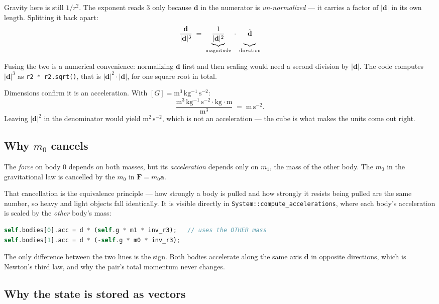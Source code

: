 \documentclass[11pt,a4paper]{article}
\newcommand{\vd}{\mathbf{d}}
\newcommand{\va}{\mathbf{a}}
\newcommand{\vF}{\mathbf{F}}
\newcommand{\dhat}{\hat{\mathbf{d}}}
\begin{document}
Gravity here is still $1/r^2$. The exponent reads 3 only because $\vd$ in the
numerator is \emph{un-normalized} --- it carries a factor of $|\vd|$ in its own
length. Splitting it back apart:
\[
  \frac{\vd}{|\vd|^{3}}
  \;=\;
  \underbrace{\frac{1}{|\vd|^{2}}}_{\text{magnitude}}
  \;\cdot\;
  \underbrace{\vphantom{\frac{1}{|\vd|^{2}}}\;\dhat\;}_{\text{direction}}
\]

Fusing the two is a numerical convenience: normalizing $\vd$ first and then
scaling would need a second division by $|\vd|$. The code computes $|\vd|^3$ as
\texttt{r2 * r2.sqrt()}, that is $|\vd|^2\cdot|\vd|$, for one square root in
total.

Dimensions confirm it is an acceleration. With
$[G] = \mathrm{m^3\,kg^{-1}\,s^{-2}}$:
\[
  \frac{\mathrm{m^{3}\,kg^{-1}\,s^{-2}} \cdot \mathrm{kg} \cdot \mathrm{m}}
       {\mathrm{m^{3}}}
  \;=\; \mathrm{m\,s^{-2}} .
\]
Leaving $|\vd|^2$ in the denominator would yield $\mathrm{m^2\,s^{-2}}$, which
is not an acceleration --- the cube is what makes the units come out right.

\subsection{Why \texorpdfstring{$m_0$}{m0} cancels}

The \emph{force} on body 0 depends on both masses, but its \emph{acceleration}
depends only on $m_1$, the mass of the other body. The $m_0$ in the
gravitational law is cancelled by the $m_0$ in $\vF = m_0\va$.

That cancellation is the equivalence principle --- how strongly a body is pulled
and how strongly it resists being pulled are the same number, so heavy and light
objects fall identically. It is visible directly in
\texttt{System::compute\_accelerations}, where each body's acceleration is
scaled by the \emph{other} body's mass:

\begin{lstlisting}[language=Rust]
self.bodies[0].acc = d * (self.g * m1 * inv_r3);   // uses the OTHER mass
self.bodies[1].acc = d * (-self.g * m0 * inv_r3);
\end{lstlisting}

The only difference between the two lines is the sign. Both bodies accelerate
along the same axis $\vd$ in opposite directions, which is Newton's third law,
and why the pair's total momentum never changes.

\subsection{Why the state is stored as vectors}
\end{document}
